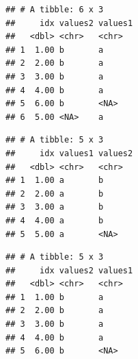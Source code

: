 \documentclass[krantz2,ChapterTOCs]{krantz}\usepackage{knitr}
\begin{document}
\begin{knitrout}\footnotesize
{}\color{fgcolor}\begin{kframe}
\begin{alltt}
\end{alltt}


{\ttfamily\noindent\itshape{}}\begin{verbatim}
## # A tibble: 6 x 3
##     idx values2 values1
##   <dbl> <chr>   <chr>  
## 1  1.00 b       a      
## 2  2.00 b       a      
## 3  3.00 b       a      
## 4  4.00 b       a      
## 5  6.00 b       <NA>   
## 6  5.00 <NA>    a
\end{verbatim}
\end{kframe}
\end{knitrout}

\begin{knitrout}\footnotesize
{}\color{fgcolor}\begin{kframe}
\begin{alltt}
\end{alltt}


{\ttfamily\noindent\itshape{}}\begin{verbatim}
## # A tibble: 5 x 3
##     idx values1 values2
##   <dbl> <chr>   <chr>  
## 1  1.00 a       b      
## 2  2.00 a       b      
## 3  3.00 a       b      
## 4  4.00 a       b      
## 5  5.00 a       <NA>
\end{verbatim}
\end{kframe}
\end{knitrout}

\begin{knitrout}\footnotesize
{}\color{fgcolor}\begin{kframe}
\begin{alltt}
\end{alltt}


{\ttfamily\noindent\itshape{}}\begin{verbatim}
## # A tibble: 5 x 3
##     idx values2 values1
##   <dbl> <chr>   <chr>  
## 1  1.00 b       a      
## 2  2.00 b       a      
## 3  3.00 b       a      
## 4  4.00 b       a      
## 5  6.00 b       <NA>
\end{verbatim}
\end{kframe}
\end{knitrout}
\end{document}
